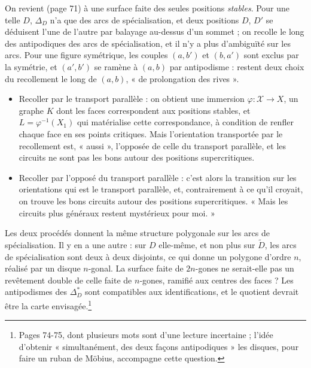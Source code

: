\documentclass[11pt,a4paper]{article}
\begin{document}
On revient (page 71) à une surface faite des seules positions \emph{stables}.
Pour une telle $D$, $\Delta_D$ n'a que des arcs de spécialisation, et deux
positions $D$, $D'$ se déduisent l'une de l'autre par balayage au-dessus d'un
sommet ; on recolle le long des antipodiques des arcs de spécialisation, et il
n'y a plus d'ambiguïté sur les arcs. Pour une figure symétrique, les couples
$(a, b')$ et $(b, a')$ sont exclus par la symétrie, et $(a', b')$ se ramène à
$(a, b)$ par antipodisme : restent deux choix du recollement le long de $(a,
b)$, « de prolongation des rives ».
\begin{itemize}
\item Recoller par le transport parallèle : on obtient une immersion $\varphi :
\mathcal{X} \to X$, un graphe $K$ dont les faces correspondent aux positions
stables, et $L = \varphi^{-1}(X_1)$ qui matérialise cette correspondance, à
condition de renfler chaque face en ses points critiques. Mais l'orientation
transportée par le recollement est, « aussi », l'opposée de celle du
transport parallèle, et les circuits ne sont pas les bons autour des positions
supercritiques.
\item Recoller par l'opposé du transport parallèle : c'est alors la transition
sur les orientations qui est le transport parallèle, et, contrairement à ce
qu'il croyait, on trouve les bons circuits autour des positions supercritiques.
« Mais les circuits plus généraux restent mystérieux pour moi. »
\end{itemize}
Les deux procédés donnent la même structure polygonale sur les arcs de
spécialisation. Il y en a une autre : sur $D$ elle-même, et non plus sur
$\widetilde{D}$, les arcs de spécialisation sont deux à deux disjoints, ce qui
donne un polygone d'ordre $n$, réalisé par un disque $n$-gonal. La surface
faite de $2n$-gones ne serait-elle pas un revêtement double de celle faite de
$n$-gones, ramifié aux centres des faces ? Les antipodismes des $\Delta^{*}_D$
sont compatibles aux identifications, et le quotient devrait être la carte
envisagée.\footnote{Pages 74-75, dont plusieurs mots sont d'une lecture
incertaine ; l'idée d'obtenir « simultanément, des deux façons antipodiques »
les disques, pour faire un ruban de Möbius, accompagne cette question.}
\end{document}

